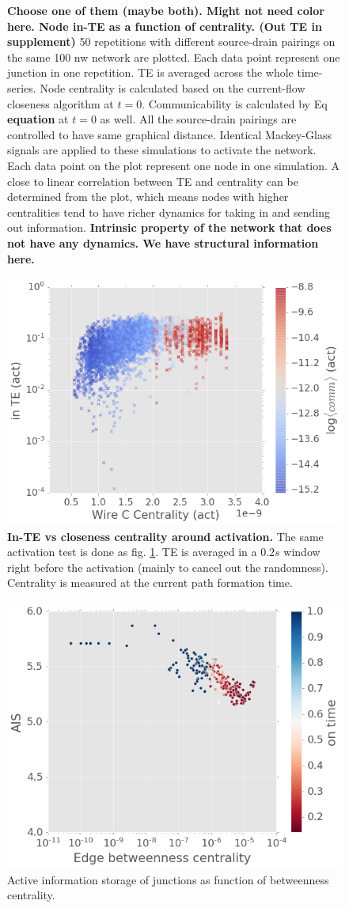 \documentclass[fleqn,10pt,  amsmath,amssymb,aps]{wlscirep}
\begin{document}
\begin{figure}[h]
	\caption{\textbf{Choose one of them (maybe both). Might not need color here. Node in-TE as a function of centrality. (Out TE in  supplement)} 50 repetitions with different source-drain pairings on the same 100 nw network are plotted. Each data point represent one junction in one repetition. TE is averaged across the whole time-series. Node centrality is calculated based on the current-flow closeness algorithm at $t = 0$. Communicability is calculated by Eq \textbf{equation} at $t = 0$ as well. All the source-drain pairings are controlled to have same graphical distance. Identical Mackey-Glass signals are applied to these simulations to activate the network. Each data point on the plot represent one node in one simulation. A close to linear correlation between TE and centrality can be determined from the plot, which means nodes with higher centralities tend to have richer dynamics for taking in and sending out information.
	\textbf{Intrinsic property of the network that does not have any dynamics. We have structural information here.}}
	\label{fig:in_te}
\end{figure}

\begin{figure}[h]
	\centering
	\includegraphics[width=0.5\linewidth]{figure/TE_cent_act}
	\caption{\textbf{In-TE vs closeness centrality around activation.} The same activation test is done as fig. \ref{fig:in_te}.	TE is averaged in a $0.2s$ window right before the activation (mainly to cancel out the randomness). Centrality is measured at the current path formation time.}
	\label{fig:TE_cent_act}
\end{figure}

\begin{figure}[h]
	\centering
	\includegraphics[width=0.5\linewidth]{figure/EC_AIS.png}
	\caption{Active information storage of junctions as function of betweenness centrality.}
	\label{fig:EC_AIS}
\end{figure}
\end{document}
